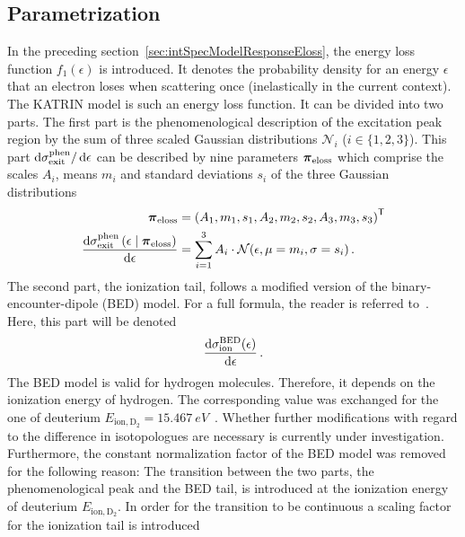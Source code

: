 \subsection{Parametrization}
In the preceding section~\ref{sec:intSpecModelResponseEloss}, the energy loss function $f_1(\epsilon)$ is introduced. It denotes the probability density for an energy $\epsilon$ that an electron loses when scattering once (inelastically in the current context). The KATRIN model is such an energy loss function. It can be divided into two parts. The first part is the phenomenological description of the excitation peak region by the sum of three scaled Gaussian distributions $\mathcal{N}_i$ ($i \in \{1,2,3\}$). This part $\mathop{}\!\mathrm{d}\sigma_\mathrm{exit}^\mathrm{phen}/\mathop{}\!\mathrm{d} \epsilon$  can be described by nine parameters $\boldsymbol{\mathbf{\pi}}_\mathrm{eloss}$ which comprise the scales $A_i$, means $m_i$ and standard deviations $s_i$ of the three Gaussian distributions~\cite{Hannen2019_2}
\newcommand{\katrinElossPhen}[1]{
	\frac{
		\d\sigma_\mathrm{exit}^\mathrm{phen}\giventhat*{#1}{\nuisanceParamVec_\mathrm{eloss}}
	}{
		\d \epsilon
	}
}
\begin{align}
\label{eq:katrinElossElossModelParams}
\nuisanceParamVec_\mathrm{eloss} &= 
\transp{\left(
	A_1, m_1, s_1, 
	A_2, m_2, s_2, 
	A_3, m_3, s_3
	\right)} \\
\katrinElossPhen{\epsilon} &=
\sum_{i=1}^3 A_i \cdot \mathcal{N}(\epsilon, \mu=m_i, \sigma=s_i)
\fullstop
\end{align}
The second part, the ionization tail, follows a modified version of the binary-encounter-dipole (BED) model. For a full formula, the reader is referred to~\cite{Kim1994}. Here, this part will be denoted
\newcommand{\katrinElossBDE}[1]{
	\frac{
		\d \sigma_\mathrm{ion}^\mathrm{BED}(#1)
	}{
		\d \epsilon
	}
}%
\newcommand{\ionEnergyDeu}{E_\mathrm{ion,D_2}}%
\begin{equation}
	\katrinElossBDE{\epsilon}
	\fullstop
\end{equation}%
The BED model is valid for hydrogen molecules. Therefore, it depends on the ionization energy of hydrogen. The corresponding value was exchanged for the one of deuterium $\ionEnergyDeu=\SI{15.467}{eV}$~\cite{Shiner1993}. Whether further modifications with regard to the difference in isotopologues are necessary is currently under investigation. Furthermore, the constant normalization factor of the BED model was removed for the following reason: The transition between the two parts, the phenomenological peak and the BED tail, is introduced at the ionization energy of deuterium $\ionEnergyDeu$. In order for the transition to be continuous a scaling factor for the ionization tail is introduced
